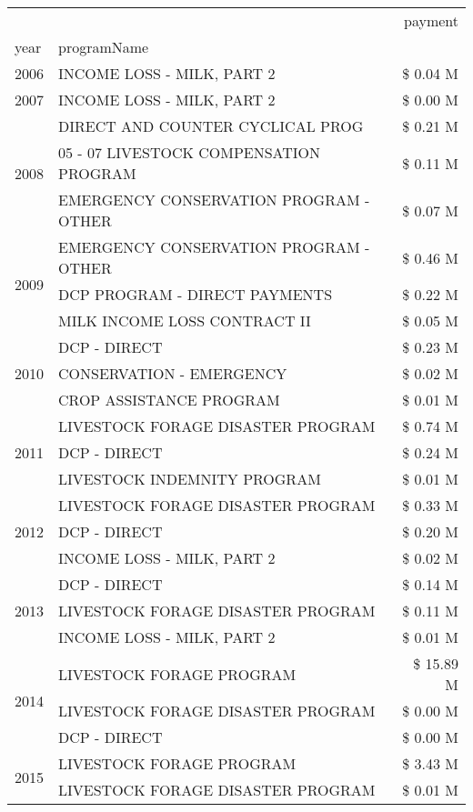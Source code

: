 \begin{tabular}{llr}
\toprule
 &  & payment \\
year & programName &  \\
\midrule
2006 & INCOME LOSS - MILK, PART 2 & \$ 0.04 M \\
\cline{1-3}
2007 & INCOME LOSS - MILK, PART 2 & \$ 0.00 M \\
\cline{1-3}
\multirow[t]{3}{*}{2008} & DIRECT AND COUNTER CYCLICAL PROG & \$ 0.21 M \\
 & 05 - 07 LIVESTOCK COMPENSATION PROGRAM & \$ 0.11 M \\
 & EMERGENCY CONSERVATION PROGRAM - OTHER & \$ 0.07 M \\
\cline{1-3}
\multirow[t]{3}{*}{2009} & EMERGENCY CONSERVATION PROGRAM - OTHER & \$ 0.46 M \\
 & DCP PROGRAM - DIRECT PAYMENTS & \$ 0.22 M \\
 & MILK INCOME LOSS CONTRACT II & \$ 0.05 M \\
\cline{1-3}
\multirow[t]{3}{*}{2010} & DCP - DIRECT & \$ 0.23 M \\
 & CONSERVATION - EMERGENCY & \$ 0.02 M \\
 & CROP ASSISTANCE PROGRAM & \$ 0.01 M \\
\cline{1-3}
\multirow[t]{3}{*}{2011} & LIVESTOCK FORAGE DISASTER PROGRAM & \$ 0.74 M \\
 & DCP - DIRECT & \$ 0.24 M \\
 & LIVESTOCK INDEMNITY PROGRAM & \$ 0.01 M \\
\cline{1-3}
\multirow[t]{3}{*}{2012} & LIVESTOCK FORAGE DISASTER PROGRAM & \$ 0.33 M \\
 & DCP - DIRECT & \$ 0.20 M \\
 & INCOME LOSS - MILK, PART 2 & \$ 0.02 M \\
\cline{1-3}
\multirow[t]{3}{*}{2013} & DCP - DIRECT & \$ 0.14 M \\
 & LIVESTOCK FORAGE DISASTER PROGRAM & \$ 0.11 M \\
 & INCOME LOSS - MILK, PART 2 & \$ 0.01 M \\
\cline{1-3}
\multirow[t]{3}{*}{2014} & LIVESTOCK FORAGE PROGRAM & \$ 15.89 M \\
 & LIVESTOCK FORAGE DISASTER PROGRAM & \$ 0.00 M \\
 & DCP - DIRECT & \$ 0.00 M \\
\cline{1-3}
\multirow[t]{3}{*}{2015} & LIVESTOCK FORAGE PROGRAM & \$ 3.43 M \\
 & LIVESTOCK FORAGE DISASTER PROGRAM & \$ 0.01 M \\

\end{tabular}
